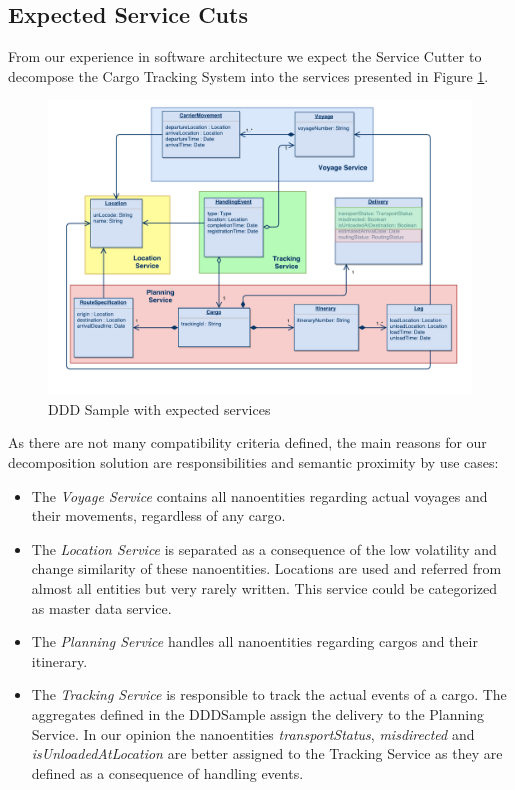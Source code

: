 \subsection{Expected Service Cuts}

From our experience in software architecture we expect the Service Cutter to decompose the Cargo Tracking System into the services presented in Figure \ref{fig:dddSampleServices}.

\begin{figure}[H]
	\includegraphics[scale=0.5]{diagrams/ddd_sample_services.pdf}
	\caption{DDD Sample with expected services}
	\label{fig:dddSampleServices}
\end{figure}

As there are not many compatibility criteria defined, the main reasons for our decomposition solution are responsibilities and semantic proximity by use cases:

\begin{itemize}
	\item The \textit{Voyage Service} contains all nanoentities regarding actual voyages and their movements, regardless of any cargo. 
	\item The \textit{Location Service} is separated as a consequence of the low volatility and change similarity of these nanoentities. Locations are used and referred from almost all entities but very rarely written. This service could be categorized as master data service.
	\item The \textit{Planning Service} handles all nanoentities regarding cargos and their itinerary. 
	\item The \textit{Tracking Service} is responsible to track the actual events of a cargo. The aggregates defined in the DDDSample assign the delivery to the Planning Service. In our opinion the nanoentities \textit{transportStatus}, \textit{misdirected} and \textit{isUnloadedAtLocation} are better assigned to the Tracking Service as they are defined as a consequence of handling events.
\end{itemize}

